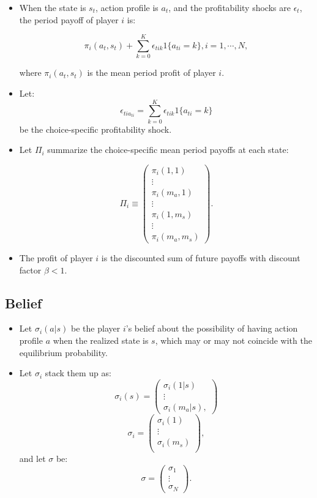 \documentclass[]{book}
\providecommand{\tightlist}{%
  \setlength{\itemsep}{0pt}\setlength{\parskip}{0pt}}
\begin{document}
\begin{itemize}
\item
  When the state is \(s_t\), action profile is \(a_t\), and the
  profitability shocks are \(\epsilon_t\), the period payoff of player
  \(i\) is:

  \begin{equation}
  \pi_i(a_t, s_t) + \sum_{k = 0}^K \epsilon_{tik}1\{a_{ti} = k\}, i = 1, \cdots, N,
  \end{equation}

  where \(\pi_i(a_t, s_t)\) is the mean period profit of player \(i\).
\item
  Let: \[
  \epsilon_{ti a_{ti}} = \sum_{k = 0}^K \epsilon_{tik}1\{a_{ti} = k\}
  \] be the choice-specific profitability shock.
\item
  Let \(\Pi_i\) summarize the choice-specific mean period payoffs at
  each state:

  \begin{equation}
  \Pi_i \equiv
  \begin{pmatrix}
  \pi_i(1, 1)\\
  \vdots\\
  \pi_i(m_a, 1)\\
  \vdots\\
  \pi_i(1, m_s)\\
  \vdots\\
  \pi_i(m_a, m_s)
  \end{pmatrix}.
  \end{equation}
\item
  The profit of player \(i\) is the discounted sum of future payoffs
  with discount factor \(\beta < 1\).
\end{itemize}

\subsection{Belief}\label{belief-1}

\begin{itemize}
\tightlist
\item
  Let \(\sigma_i(a|s)\) be the player \(i\)'s belief about the
  possibility of having action profile \(a\) when the realized state is
  \(s\), which may or may not coincide with the equilibrium probability.
\item
  Let \(\sigma_i\) stack them up as: \[
  \sigma_i(s) =
  \begin{pmatrix}
  \sigma_i(1|s)\\
  \vdots\\
  \sigma_i(m_a|s),
  \end{pmatrix}
  \] \[
  \sigma_i =
  \begin{pmatrix}
  \sigma_i(1)\\
  \vdots \\
  \sigma_i(m_s)\\
  \end{pmatrix},
  \] and let \(\sigma\) be: \[
  \sigma = 
  \begin{pmatrix}
  \sigma_1 \\
  \vdots\\
  \sigma_N
  \end{pmatrix}.
  \]
\end{itemize}
\end{document}
